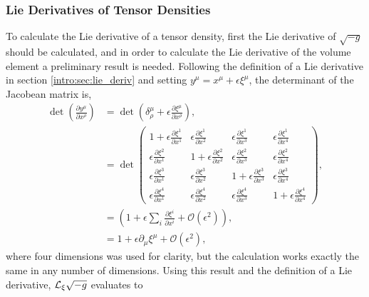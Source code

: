 \subsubsection{Lie Derivatives of Tensor Densities}
To calculate the Lie derivative of a tensor density, first the Lie derivative of $\sqrt{-g}$ should be calculated, and in order to calculate the Lie derivative of the volume element a preliminary result is needed. Following the definition of a Lie derivative in section \ref{intro:sec:lie_deriv} and setting $y^\mu = x^\mu + \epsilon \xi^\mu$, the determinant of the Jacobean matrix is,
\begin{align}
 \det\left(\frac{\partial y^\mu}{\partial x^\rho}\right) 
&= \det\left(\delta^\mu_\rho + \epsilon \frac{\partial \xi^\mu}{\partial x^\rho}\right) ,\\ 
&= \det\begin{pmatrix} 
1+\epsilon\frac{\partial \xi^1}{\partial x^1}& \epsilon\frac{\partial \xi^1}{\partial x^2}& \epsilon\frac{\partial \xi^1}{\partial x^3}& \epsilon\frac{\partial \xi^1}{\partial x^4}\\
\epsilon\frac{\partial \xi^2}{\partial x^1}& 1+\epsilon\frac{\partial \xi^2}{\partial x^2}& \epsilon\frac{\partial \xi^2}{\partial x^3}& \epsilon\frac{\partial \xi^2}{\partial x^4}\\
\epsilon\frac{\partial \xi^3}{\partial x^1}& \epsilon\frac{\partial \xi^3}{\partial x^2}& 1+\epsilon\frac{\partial \xi^3}{\partial x^3}& \epsilon\frac{\partial \xi^3}{\partial x^4}\\ 
\epsilon\frac{\partial \xi^4}{\partial x^1}&\epsilon\frac{\partial \xi^4}{\partial x^2} & \epsilon\frac{\partial \xi^4}{\partial x^3}& 1+\epsilon\frac{\partial \xi^4}{\partial x^4}\end{pmatrix} ,\\
&=\left(1 + \epsilon \sum_i \frac{\partial \xi^i}{\partial x^i} + \mathcal{O}(\epsilon^2)\right) ,\\
&=1 + \epsilon \partial_\mu \xi^\mu + \mathcal{O}(\epsilon^2),
\end{align}
where four dimensions was used for clarity, but the calculation works exactly the same in any number of dimensions. Using this result and the definition of a Lie derivative, $\mathcal{L}_\xi \sqrt{-g}$ evaluates to
